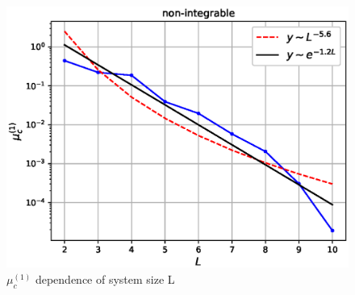 \documentclass[11pt,a4paper]{article}
\begin{document}
\begin{figure}[!ht]
\begin{center}
\includegraphics[scale=0.7]{new_pics/mu_c_1_nonint.eps}
\caption{$\mu_c^{(1)}$ dependence of system size L }
\end{center}
\end{figure}
\end{document}
